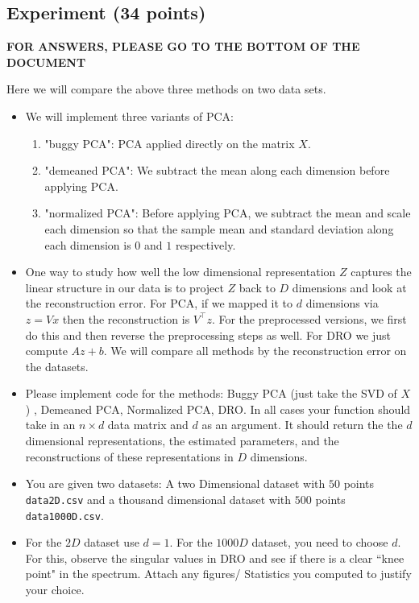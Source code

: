 \documentclass[a4paper]{article}
\theoremstyle{definition}
\begin{document}
\subsection{Experiment (34 points)}

\textbf{FOR ANSWERS, PLEASE GO TO THE BOTTOM OF THE DOCUMENT}

Here we will compare the above three methods on two data sets. 

\begin{itemize}
\item We will implement three variants of PCA:
\begin{enumerate}
    \item "buggy PCA": PCA applied directly on the matrix $X$.
    \item "demeaned PCA": We subtract the mean along each dimension before applying PCA.
    \item "normalized PCA": Before applying PCA, we subtract the mean and scale each dimension so that the sample  mean and standard deviation along each dimension is $0$ and $1$ respectively.
    
\end{enumerate}



\item 
One way to study how well the low dimensional representation $Z$ captures the linear
structure in our data is to project $Z$ back to $D$ dimensions and look at the reconstruction
error. For PCA, if we mapped it to $d$ dimensions via $z = Vx$ then the
reconstruction is $V^\top z$. For the preprocessed versions, we first do this and then
reverse the preprocessing steps as well. For DRO  we just compute $Az + b$.
We will compare all methods by the reconstruction error on the datasets.

\item 
Please implement code for the methods: Buggy PCA (just take the SVD of $X$)
, Demeaned PCA,
Normalized PCA, DRO. In all cases your function should take in
an $n \times d$ data matrix and $d$ as an argument. It should return the
the $d$ dimensional representations, the estimated parameters, and the
reconstructions of these representations in $D$ dimensions. 

\item
You are given two datasets: A two Dimensional dataset with $50$ points 
\texttt{data2D.csv} and a thousand dimensional dataset with $500$ points
\texttt{data1000D.csv}. 

\item
For the $2D$ dataset use $d=1$. For the $1000D$ dataset, you need to choose
$d$. For this, observe the singular values in DRO and see if there is a clear
``knee point" in the spectrum.
Attach any figures/ Statistics you computed to justify your choice.


\end{itemize}
\end{document}
